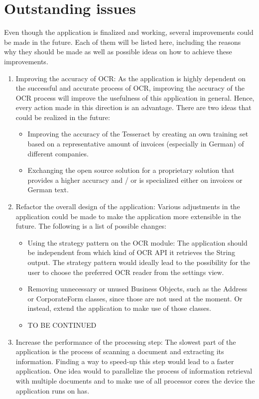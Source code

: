 \section{Outstanding issues}
Even though the application is finalized and working, several improvements could be made in the future.
Each of them will be listed here, including the reasons why they should be made as well as possible ideas on how to achieve these improvements.
\begin{enumerate}
	\item Improving the accuracy of OCR: As the application is highly dependent on the successful and accurate process of OCR, improving the accuracy of the OCR process will improve the usefulness of this application in general. Hence, every action made in this direction is an advantage. There are two ideas that could be realized in the future: 
	\begin{itemize}
		\item Improving the accuracy of the Tesseract by creating an own training set based on a representative amount of invoices (especially in German) of different companies.
		\item Exchanging the open source solution for a proprietary solution that provides a higher accuracy and / or is specialized either on invoices or German text.
	\end{itemize}
	\item Refactor the overall design of the application: Various adjustments in the application could be made to make the application more extensible in the future. The following is a list of possible changes:
	\begin{itemize}
		\item Using the strategy pattern on the OCR module: The application should be independent from which kind of OCR API it retrieves the String output. The strategy pattern would ideally lead to the possibility for the user to choose the preferred OCR reader from the settings view.
		\item Removing unnecessary or unused Business Objects, such as the Address or CorporateForm classes, since those are not used at the moment. Or instead, extend the application to make use of those classes.
		\item TO BE CONTINUED %
	\end{itemize}
	\item Increase the performance of the processing step: The slowest part of the application is the process of scanning a document and extracting its information. Finding a way to speed-up this step would lead to a faster application. One idea would to parallelize the process of information retrieval with multiple documents and to make use of all processor cores the device the application runs on has.
\end{enumerate}
